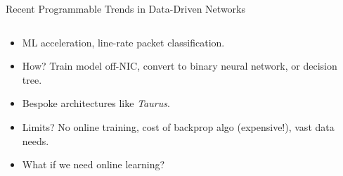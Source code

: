 \documentclass[aspectratio=169,xcolor={dvipsnames}
,handout
]{beamer}
\begin{document}
\begin{frame}{Recent Programmable Trends in Data-Driven Networks}
	\begin{columns}
		\begin{column}{0.6\linewidth}
			\begin{itemize}
				\item ML acceleration, line-rate packet classification.
				\item How? Train model off-NIC, convert to \alert{binary neural network}\footnotemark, or \alert{decision tree}\footnotemark.
				\item Bespoke architectures like \emph{Taurus}\footnotemark.
				\item Limits? No online training, cost of backprop algo (expensive!), vast data needs.
				\item \alert{What if we need online learning?}
			\end{itemize}
		\end{column}
		\begin{column}{0.4\linewidth}
			\centering
		

\end{column}
\end{columns}
\end{frame}
\end{document}
